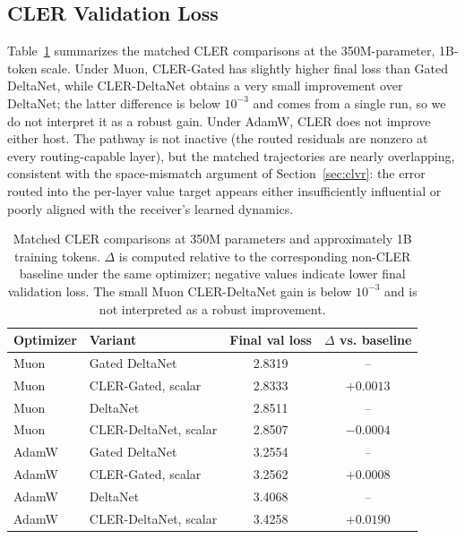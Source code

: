 \documentclass{article}
\begin{document}
\begin{table}[tbp]
    \centering
    \caption{Matched 350M-parameter, 15B-token Muon downstream evaluations for Gated DeltaNet and DeltaNet routing checkpoints. All rows use the scoring-server lm-eval-harness path with full-sequence forward passes, the LLaMA2 tokenizer, batch size 8, maximum length 4096, and zero-shot evaluation.}
    \label{tab:cler-downstream-15b}
    \resizebox{\linewidth}{!}{}
\end{table}

\subsection{CLER Validation Loss}

Table~\ref{tab:cler-results} summarizes the matched CLER comparisons at the 350M-parameter, 1B-token scale. Under Muon, CLER-Gated has slightly higher final loss than Gated DeltaNet, while CLER-DeltaNet obtains a very small improvement over DeltaNet; the latter difference is below $10^{-3}$ and comes from a single run, so we do not interpret it as a robust gain. Under AdamW, CLER does not improve either host. The pathway is not inactive (the routed residuals are nonzero at every routing-capable layer), but the matched trajectories are nearly overlapping, consistent with the space-mismatch argument of Section~\ref{sec:clvr}: the error routed into the per-layer value target appears either insufficiently influential or poorly aligned with the receiver's learned dynamics.


\begin{table}[tbp]
    \centering
    \caption{Matched CLER comparisons at 350M parameters and approximately 1B training tokens. $\Delta$ is computed relative to the corresponding non-CLER baseline under the same optimizer; negative values indicate lower final validation loss. The small Muon CLER-DeltaNet gain is below $10^{-3}$ and is not interpreted as a robust improvement.}
    \label{tab:cler-results}
    \begin{tabular}{llcc}
        \toprule
        Optimizer & Variant & Final val loss & $\Delta$ vs. baseline \\
        \midrule
        Muon & Gated DeltaNet & 2.8319 & -- \\
        Muon & CLER-Gated, scalar & 2.8333 & $+0.0013$ \\
        Muon & DeltaNet & 2.8511 & -- \\
        Muon & CLER-DeltaNet, scalar & 2.8507 & $-0.0004$ \\
        \midrule
        AdamW & Gated DeltaNet & 3.2554 & -- \\
        AdamW & CLER-Gated, scalar & 3.2562 & $+0.0008$ \\
        AdamW & DeltaNet & 3.4068 & -- \\
        AdamW & CLER-DeltaNet, scalar & 3.4258 & $+0.0190$ \\
        \bottomrule
    \end{tabular}
\end{table}
\end{document}
